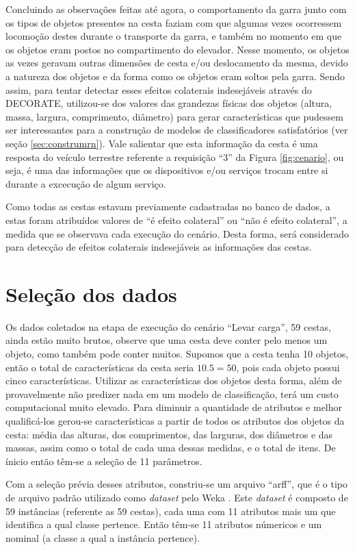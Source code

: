 Concluindo as observações feitas até agora, o comportamento da garra junto com os tipos de objetos presentes na cesta faziam com que algumas vezes ocorressem locomoção destes durante o transporte da garra, e também no momento em que os objetos eram postos no compartimento do elevador. Nesse momento, os objetos as vezes geravam outras dimensões de cesta e/ou deslocamento da mesma, devido a natureza dos objetos e da forma como os objetos eram soltos pela garra. Sendo assim, para tentar detectar esses efeitos colaterais indesejáveis através do DECORATE, utilizou-se dos valores das grandezas físicas dos objetos (altura, massa, largura, comprimento, diâmetro) para gerar características que pudessem ser interessantes para a construção de modelos de classificadores satisfatórios (ver seção \ref{sec:construmrn}). Vale salientar que esta informação da cesta é uma resposta do veículo terrestre referente a requisição ``3'' da Figura \ref{fig:cenario}, ou seja, é uma das informações que os dispositivos e/ou serviços trocam entre si durante a excecução de algum serviço.

Como todas as cestas estavam previamente cadastradas no banco de dados, a estas foram atribuídos valores de ``é efeito colateral'' ou ``não é efeito colateral'', a medida que se observava cada execução do cenário. Desta forma, será considerado para detecção de efeitos colaterais indesejáveis as informações das cestas.

\section{Seleção dos dados}
\label{sec:selecaodados}
Os dados coletados na etapa de execução do cenário ``Levar carga'', 59 cestas, ainda estão muito brutos, observe que uma cesta deve conter pelo menos um objeto, como também pode conter muitos. Supomos que a cesta tenha 10 objetos, então o total de características da cesta seria $10.5=50$, pois cada objeto possui cinco características. Utilizar as características dos objetos desta forma, além de provavelmente não predizer nada em um modelo de classificação, terá um custo computacional muito elevado. Para diminuir a quantidade de atributos e melhor qualificá-los gerou-se características a partir de todos os atributos dos objetos da cesta: média das alturas, dos comprimentos, das larguras, dos diâmetros e das massas, assim como o total de cada uma dessas medidas, e o total de itens. De ínicio então têm-se a seleção de 11 parâmetros.

Com a seleção prévia desses atributos, constriu-se um arquivo ``arff'', que é o tipo de arquivo padrão utilizado como \textit{dataset} pelo Weka \cite{Hall:2009}. Este \textit{dataset} é composto de 59 instâncias (referente as 59 cestas), cada uma com 11 atributos mais um que identifica a qual classe pertence. Então têm-se 11 atributos númericos e um nominal (a classe a qual a instância pertence).

